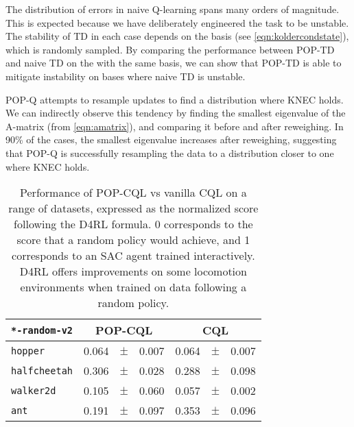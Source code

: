 The distribution of errors in naive Q-learning spans many orders of magnitude. This is expected because we have deliberately engineered the task to be unstable. The stability of TD in each case depends on the basis (see \cref{eqn:koldercondstate}), which is randomly sampled. By comparing the performance between POP-TD and naive TD on the with the same basis, we can show that POP-TD is able to mitigate instability on bases where naive TD is unstable.

POP-Q attempts to resample updates to find a distribution where KNEC holds. We can indirectly observe this tendency by finding the smallest eigenvalue of the A-matrix (from \cref{eqn:amatrix}), and comparing it before and after reweighing. In 90\% of the cases, the smallest eigenvalue increases after reweighing, suggesting that POP-Q is successfully resampling the data to a distribution closer to one where KNEC holds.

\begin{table}[t]
  \centering
  \begin{tabular}{lr@{\,}c@{\,}lr@{\,}c@{\,}l}\hline\hline
\texttt{*-random-v2} & \multicolumn{3}{c}{POP-CQL} & \multicolumn{3}{c}{CQL}
\\\hline
  	\texttt{hopper}      & 0.064 & $\pm$ & 0.007 & 0.064 & $\pm$ & 0.007
\\	\texttt{halfcheetah} & 0.306 & $\pm$ & 0.028 & 0.288 & $\pm$ & 0.098
\\	\texttt{walker2d}    & 0.105 & $\pm$ & 0.060 & 0.057 & $\pm$ & 0.002
\\	\texttt{ant}         & 0.191 & $\pm$ & 0.097 & 0.353 & $\pm$ & 0.096
\\ \hline\hline
  \end{tabular}
  \caption{Performance of POP-CQL vs vanilla CQL on a range of datasets, expressed as the normalized score following the D4RL formula. 0 corresponds to the score that a random policy would achieve, and 1 corresponds to an SAC agent trained interactively. D4RL offers improvements on some locomotion environments when trained on data following a random policy. }
  \label{tab:resultsd4rl}
\end{table}



